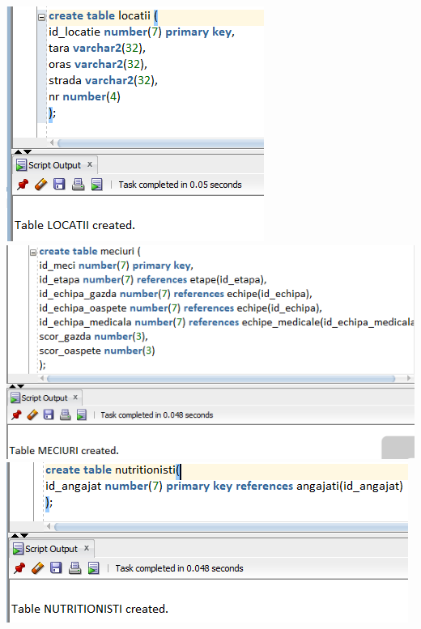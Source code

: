 \documentclass{article}
\begin{document}
\begin{multicols*}{4}
\vspace{4em}
\includegraphics[width=\linewidth]{creation/locatii}
\vspace{4em}
\includegraphics[width=\linewidth]{creation/meciuri}
\vspace{4em}
\includegraphics[width=\linewidth]{creation/nutritionisti}

\end{multicols*}
\end{document}

